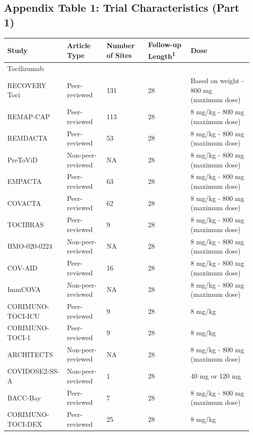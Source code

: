 \documentclass[
  12pt,
]{article}
\begin{document}
\begin{landscape}

\hypertarget{appendix-table-1-trial-characteristics-part-1}{%
\subsection{Appendix Table 1: Trial Characteristics (Part
1)}\label{appendix-table-1-trial-characteristics-part-1}}

\captionsetup[table]{labelformat=empty,skip=1pt}
\begin{longtable}{lllll}
\toprule
Study & Article Type & Number of Sites & Follow-up Length\textsuperscript{1} & Dose \\ 
\midrule
\multicolumn{1}{l}{Tocilizumab} \\ 
\midrule
RECOVERY Toci & Peer-reviewed & 131 & 28 & Based on weight - 800 mg (maximum dose) \\ 
REMAP-CAP & Peer-reviewed & 113 & 28 & 8 mg/kg - 800 mg (maximum dose) \\ 
REMDACTA & Peer-reviewed & 53 & 28 & 8 mg/kg - 800 mg (maximum dose) \\ 
PreToViD & Non-peer-reviewed & NA & 28 & 8 mg/kg - 800 mg (maximum dose) \\ 
EMPACTA & Peer-reviewed & 63 & 28 & 8 mg/kg - 800 mg (maximum dose) \\ 
COVACTA & Peer-reviewed & 62 & 28 & 8 mg/kg - 800 mg (maximum dose) \\ 
TOCIBRAS & Peer-reviewed & 9 & 28 & 8 mg/kg - 800 mg (maximum dose) \\ 
HMO-020-0224 & Non-peer-reviewed & NA & 28 & 8 mg/kg - 800 mg (maximum dose) \\ 
COV-AID & Peer-reviewed & 16 & 28 & 8 mg/kg - 800 mg (maximum dose) \\ 
ImmCOVA & Non-peer-reviewed & NA & 28 & 8 mg/kg - 800 mg (maximum dose) \\ 
CORIMUNO-TOCI-ICU & Peer-reviewed & 9 & 28 & 8 mg/kg \\ 
CORIMUNO-TOCI-1 & Peer-reviewed & 9 & 28 & 8 mg/kg \\ 
ARCHITECTS & Non-peer-reviewed & NA & 28 & 8 mg/kg - 800 mg (maximum dose) \\ 
COVIDOSE2-SS-A & Non-peer-reviewed & 1 & 28 & 40 mg or 120 mg \\ 
BACC-Bay & Peer-reviewed & 7 & 28 & 8 mg/kg - 800 mg (maximum dose) \\ 
CORIMUNO-TOCI-DEX & Peer-reviewed & 25 & 28 & 8 mg/kg \\ 

\end{longtable}
\end{landscape}
\end{document}
